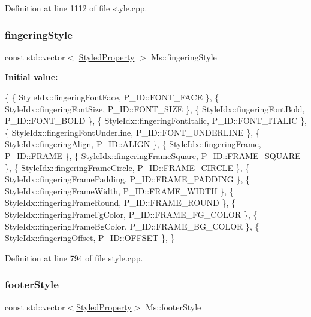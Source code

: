Definition at line 1112 of file style.\+cpp.

\mbox{\label{namespace_ms_a8a126b48f9d2b613dcb2b8c30e793aa6}} 
\subsubsection{\texorpdfstring{fingering\+Style}{fingeringStyle}}
{\footnotesize\ttfamily const std\+::vector$<$ \hyperlink{struct_ms_1_1_styled_property}{Styled\+Property} $>$ Ms\+::fingering\+Style}

{\bfseries Initial value\+:}
\begin{DoxyCode}
\{
      \{ StyleIdx::fingeringFontFace,                  P\_ID::FONT\_FACE              \},
      \{ StyleIdx::fingeringFontSize,                  P\_ID::FONT\_SIZE              \},
      \{ StyleIdx::fingeringFontBold,                  P\_ID::FONT\_BOLD              \},
      \{ StyleIdx::fingeringFontItalic,                P\_ID::FONT\_ITALIC            \},
      \{ StyleIdx::fingeringFontUnderline,             P\_ID::FONT\_UNDERLINE         \},
      \{ StyleIdx::fingeringAlign,                     P\_ID::ALIGN                  \},
      \{ StyleIdx::fingeringFrame,                     P\_ID::FRAME                  \},
      \{ StyleIdx::fingeringFrameSquare,               P\_ID::FRAME\_SQUARE           \},
      \{ StyleIdx::fingeringFrameCircle,               P\_ID::FRAME\_CIRCLE           \},
      \{ StyleIdx::fingeringFramePadding,              P\_ID::FRAME\_PADDING          \},
      \{ StyleIdx::fingeringFrameWidth,                P\_ID::FRAME\_WIDTH            \},
      \{ StyleIdx::fingeringFrameRound,                P\_ID::FRAME\_ROUND            \},
      \{ StyleIdx::fingeringFrameFgColor,              P\_ID::FRAME\_FG\_COLOR         \},
      \{ StyleIdx::fingeringFrameBgColor,              P\_ID::FRAME\_BG\_COLOR         \},
      \{ StyleIdx::fingeringOffset,                    P\_ID::OFFSET                 \},
      \}
\end{DoxyCode}


Definition at line 794 of file style.\+cpp.

\mbox{\label{namespace_ms_a97bcbe31d7395fdd41924638cff0e6d8}} 
\subsubsection{\texorpdfstring{footer\+Style}{footerStyle}}
{\footnotesize\ttfamily const std\+::vector$<$\hyperlink{struct_ms_1_1_styled_property}{Styled\+Property}$>$ Ms\+::footer\+Style}

